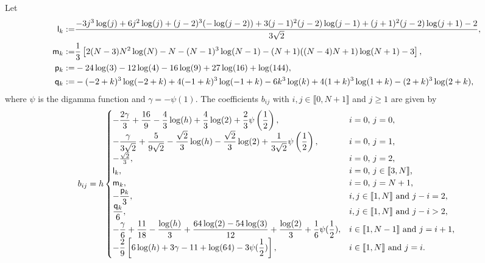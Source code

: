 \documentclass[11 pt]{article}
\newcommand\inter[1]{\llbracket #1\rrbracket}
\numberwithin{equation}{section}
\begin{document}
Let
\begin{align*} \notag
\mathsf{l}_k:= & \frac{-3 j^3 \log (j)+6 j^2 \log (j)+(j-2)^3 (-\log (j-2))+3
   (j-1)^2 (j-2) \log (j-1)+(j+1)^2 (j-2) \log (j+1)-2}{3\sqrt{2}}, \\
   \mathsf{m}_k:= & \frac{1}{3}\left[2 (N-3) N^2 \log (N)-N-(N-1)^3 \log (N-1)-(N+1) ((N-4) N+1) \log (N+1)-3\right], \\
\mathsf{p}_k:=&  -24\log(3) - 12\log(4) - 16\log(9) + 27\log(16) + \log(144), \\ \notag
\mathsf{q}_k:=&-(-2 + k)^3\log(-2 + k) + 4(-1 + k)^3\log(-1 + k) - 6 k^3 \log(k) +4(1 + k)^3\log(1 + k) - (2 + k)^3\log(2 + k),
\end{align*}
where $\psi$ is the digamma function and $\gamma=-\psi(1)$.  The coefficients $b_{ij}$ with $i,j\in\inter{0,N+1}$ and $j\geq 1$ are given by
%
\begin{equation}\label{stiff:LogLap}
b_{ij}= h
\begin{cases}
\displaystyle -\frac{2 \gamma }{3}+\frac{16}{9}-\frac{4}{3}  \log (h)+\frac{4}{3}  \log
   (2)+\frac{2}{3}  \psi \left(\frac{1}{2}\right), & \textnormal{$i=0$, $j=0$,} \\
\displaystyle -\frac{\gamma }{3\sqrt{2}}+\frac{5}{9\sqrt{2}}-\frac{\sqrt{2}}{3} \log (h)-\frac{\sqrt{2}}{3}  \log
   (2)+\frac{1}{3\sqrt{2}} \psi \left(\frac{1}{2}\right), & \textnormal{$i=0$, $j=1$,} \\
   -\frac{\sqrt {2}}{3},
 & \parbox[t]{.3\columnwidth}{$i=0$, $j=2$,}\\
 \mathsf{l}_k, 
 & \parbox[t]{.3\columnwidth}{$i=0$, $j\in\inter{3,N}$,}\\
 \mathsf{m}_k, &  \parbox[t]{.3\columnwidth}{$i=0$, $j=N+1$,}\\
\displaystyle -\frac{\mathsf p_k}{3}, & \textnormal{$i,j\in\inter{1,N}$ and $j-i=2$,} \\
\displaystyle \frac{\mathsf q_k}{6}, & \textnormal{$i,j\in\inter{1,N}$ and $j-i> 2$,} \\
\displaystyle -\frac{\gamma}{6} + \frac{11}{18} - \frac{\log(h)}{3}  + \frac{64\log(2) - 54\log(3)}{12} + \frac{\log(2)}{3}  + \frac{1}{6} \psi(\frac 12), & \textnormal{$i\in\inter{1,N-1}$ and $j=i+1$,} \\
\displaystyle -\frac{2}{9}\left[6\log(h) + 3\gamma - 11 + \log(64) - 3\psi(\frac12)\right], & \textnormal{$i\in\inter{1,N}$ and $j=i$.}
\end{cases}
\end{equation}
\end{document}
